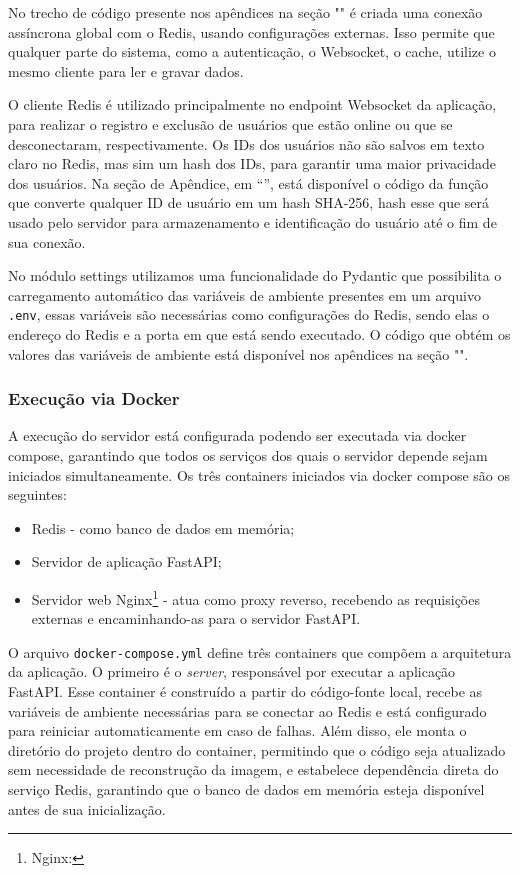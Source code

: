 No trecho de código presente nos apêndices na seção
"" é criada uma conexão assíncrona
global com o Redis, usando configurações externas. Isso permite que
qualquer parte
do sistema, como a autenticação, o Websocket, o cache, utilize o
mesmo cliente para ler e gravar dados.

O cliente Redis é utilizado principalmente no endpoint Websocket da
aplicação, para realizar o registro e exclusão de usuários que estão
online ou que se desconectaram, respectivamente. Os \acsp{ID} dos usuários
não são salvos em texto claro no Redis, mas sim um hash dos \acsp{ID}, para
garantir uma maior privacidade dos usuários. Na seção de Apêndice, em
“”, está disponível o código da função
que converte qualquer \acs{ID} de usuário em um hash SHA-256, hash esse que
será usado pelo servidor para armazenamento e identificação do
usuário até o fim de sua conexão.

No módulo settings utilizamos uma funcionalidade do Pydantic que
possibilita o carregamento automático das variáveis de ambiente
presentes em um arquivo \texttt{.env}, essas variáveis são necessárias como
configurações do Redis, sendo elas o endereço do Redis e a porta em
que está sendo executado. O código que obtém os valores das variáveis
de ambiente está disponível nos apêndices na seção
"".

\subsubsection{Execução via Docker}

A execução do servidor está configurada podendo ser executada via
docker compose, garantindo que todos os serviços dos quais o servidor
depende sejam iniciados simultaneamente. Os três containers iniciados
via docker compose são os seguintes:

\begin{itemize}
  \item Redis - como banco de dados em memória;
  \item Servidor de aplicação FastAPI;
  \item Servidor web Nginx\footnote{Nginx: } -
    atua como proxy reverso, recebendo as
    requisições externas e encaminhando-as para o servidor FastAPI.
\end{itemize}

O arquivo \texttt{docker-compose.yml} define três containers que compõem a
arquitetura da aplicação. O primeiro é o \textit{server}, responsável por
executar a aplicação FastAPI. Esse container é construído a partir do
código-fonte local, recebe as variáveis de ambiente necessárias para
se conectar ao Redis e está configurado para reiniciar
automaticamente em caso de falhas. Além disso, ele monta o diretório
do projeto dentro do container, permitindo que o código seja
atualizado sem necessidade de reconstrução da imagem, e estabelece
dependência direta do serviço Redis, garantindo que o banco de dados
em memória esteja disponível antes de sua inicialização.

